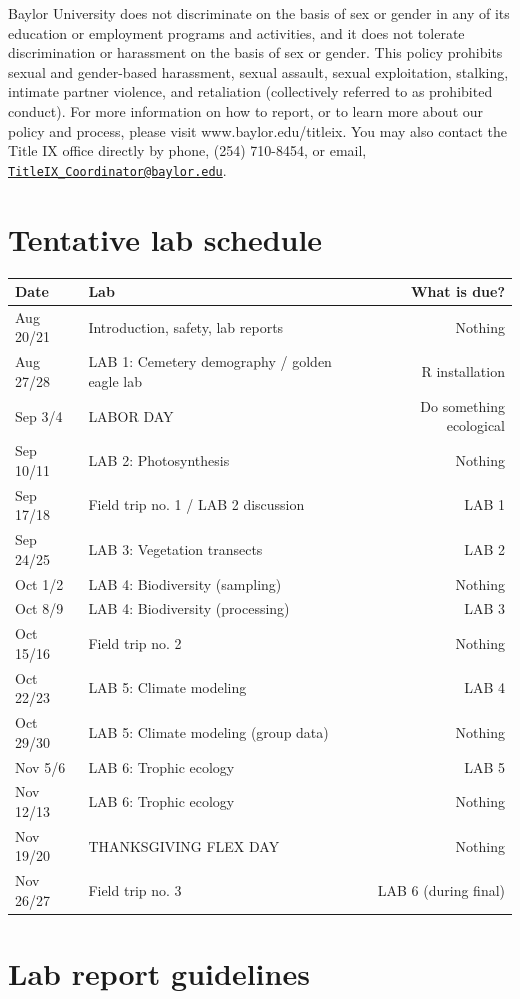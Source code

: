 \documentclass[11pt,]{article}
\begin{document}
Baylor University does not discriminate on the basis of sex or gender in
any of its education or employment programs and activities, and it does
not tolerate discrimination or harassment on the basis of sex or gender.
This policy prohibits sexual and gender-based harassment, sexual
assault, sexual exploitation, stalking, intimate partner violence, and
retaliation (collectively referred to as prohibited conduct). For more
information on how to report, or to learn more about our policy and
process, please visit www.baylor.edu/titleix. You may also contact the
Title IX office directly by phone, (254) 710-8454, or email,
\href{mailto:TitleIX_Coordinator@baylor.edu}{\nolinkurl{TitleIX\_Coordinator@baylor.edu}}.

\newpage

\section{Tentative lab schedule}\label{tentative-lab-schedule}

\begin{longtable}[]{@{}llr@{}}
\toprule
Date & Lab & What is due?\tabularnewline
\midrule
\endhead
Aug 20/21 & Introduction, safety, lab reports & Nothing\tabularnewline
Aug 27/28 & LAB 1: Cemetery demography / golden eagle lab & R
installation\tabularnewline
Sep 3/4 & LABOR DAY & Do something ecological\tabularnewline
Sep 10/11 & LAB 2: Photosynthesis & Nothing\tabularnewline
Sep 17/18 & Field trip no. 1 / LAB 2 discussion & LAB 1\tabularnewline
Sep 24/25 & LAB 3: Vegetation transects & LAB 2\tabularnewline
Oct 1/2 & LAB 4: Biodiversity (sampling) & Nothing\tabularnewline
Oct 8/9 & LAB 4: Biodiversity (processing) & LAB 3\tabularnewline
Oct 15/16 & Field trip no. 2 & Nothing\tabularnewline
Oct 22/23 & LAB 5: Climate modeling & LAB 4\tabularnewline
Oct 29/30 & LAB 5: Climate modeling (group data) &
Nothing\tabularnewline
Nov 5/6 & LAB 6: Trophic ecology & LAB 5\tabularnewline
Nov 12/13 & LAB 6: Trophic ecology & Nothing\tabularnewline
Nov 19/20 & THANKSGIVING FLEX DAY & Nothing\tabularnewline
Nov 26/27 & Field trip no. 3 & LAB 6 (during final)\tabularnewline
\bottomrule
\end{longtable}

\newpage

\section{Lab report guidelines}\label{lab-report-guidelines}
\end{document}
